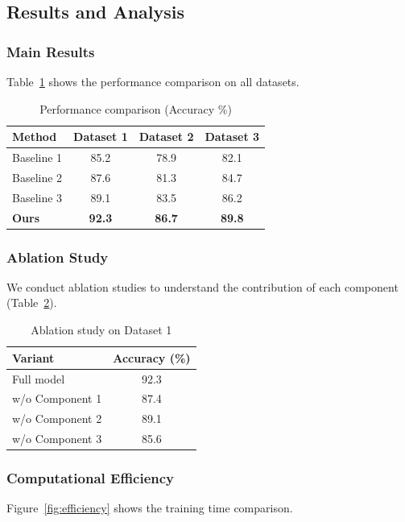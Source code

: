 \documentclass[10pt,twocolumn]{article}
\begin{document}
\subsection{Results and Analysis}

\subsubsection{Main Results}
Table~\ref{tab:main_results} shows the performance comparison on all datasets.

\begin{table}[H]
\centering
\caption{Performance comparison (Accuracy \%)}
\label{tab:main_results}
\begin{tabular}{@{}lccc@{}}
\toprule
\textbf{Method} & \textbf{Dataset 1} & \textbf{Dataset 2} & \textbf{Dataset 3} \\
\midrule
Baseline 1 & 85.2 & 78.9 & 82.1 \\
Baseline 2 & 87.6 & 81.3 & 84.7 \\
Baseline 3 & 89.1 & 83.5 & 86.2 \\
\textbf{Ours} & \textbf{92.3} & \textbf{86.7} & \textbf{89.8} \\
\bottomrule
\end{tabular}
\end{table}

\subsubsection{Ablation Study}
We conduct ablation studies to understand the contribution of each component (Table~\ref{tab:ablation}).

\begin{table}[H]
\centering
\caption{Ablation study on Dataset 1}
\label{tab:ablation}
\begin{tabular}{@{}lc@{}}
\toprule
\textbf{Variant} & \textbf{Accuracy (\%)} \\
\midrule
Full model & 92.3 \\
w/o Component 1 & 87.4 \\
w/o Component 2 & 89.1 \\
w/o Component 3 & 85.6 \\
\bottomrule
\end{tabular}
\end{table}

\subsubsection{Computational Efficiency}
Figure~\ref{fig:efficiency} shows the training time comparison.
\end{document}
